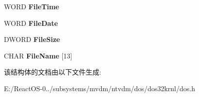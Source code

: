 \begin{DoxyCompactItemize}
W\+O\+RD {\bfseries File\+Time}
\item 
\mbox{\label{struct___d_o_s___f_i_n_d___f_i_l_e___b_l_o_c_k_a9c3b4f6fc0f8f626555f0d6c5f800f71}} 
W\+O\+RD {\bfseries File\+Date}
\item 
\mbox{\label{struct___d_o_s___f_i_n_d___f_i_l_e___b_l_o_c_k_af0ae7843102296525e74b30723e9e3e8}} 
D\+W\+O\+RD {\bfseries File\+Size}
\item 
\mbox{\label{struct___d_o_s___f_i_n_d___f_i_l_e___b_l_o_c_k_ab56d84fefeb785111b305fb8a6459eaf}} 
C\+H\+AR {\bfseries File\+Name} \mbox{[}13\mbox{]}
\end{DoxyCompactItemize}


该结构体的文档由以下文件生成\+:\begin{DoxyCompactItemize}
\item 
E\+:/\+React\+O\+S-\/0../subsystems/mvdm/ntvdm/dos/dos32krnl/dos.\+h\end{DoxyCompactItemize}
